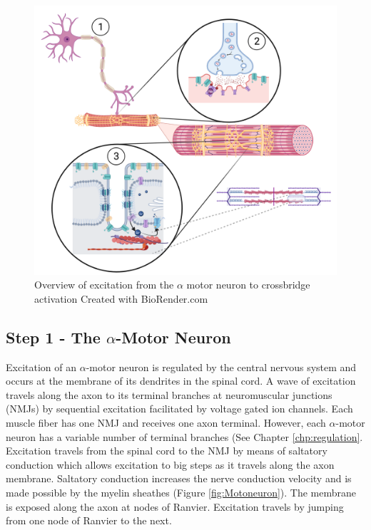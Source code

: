 \begin{figure}[!ht]
    \centering
    \includegraphics[width=1\linewidth]{./figure/excitation_overview.png}
    \caption{Overview of excitation from the $\alpha$ motor neuron to crossbridge activation \footnotesize{Created with BioRender.com}}
    \label{fig:excitation_overview}
\end{figure}

\subsection{Step 1 - The $\alpha$-Motor Neuron}
Excitation of an $\alpha$-motor neuron is regulated by the central nervous system and occurs at the membrane of its dendrites in the spinal cord. A wave of excitation travels along the axon to its terminal branches at neuromuscular junctions (NMJs) by sequential excitation facilitated by voltage gated ion channels. Each muscle fiber has one NMJ and receives one axon terminal. However, each $\alpha$-motor neuron has a variable number of terminal branches (See Chapter \ref{chp:regulation}.  Excitation travels from the spinal cord to the NMJ by means of saltatory conduction which allows excitation to big steps as it travels along the axon membrane. Saltatory conduction increases the nerve conduction velocity and is made possible by the myelin sheathes (Figure \ref{fig:Motoneuron}). The membrane is exposed along the axon at nodes of Ranvier. Excitation travels by jumping from one node of Ranvier to the next.\footnotemark{} 

